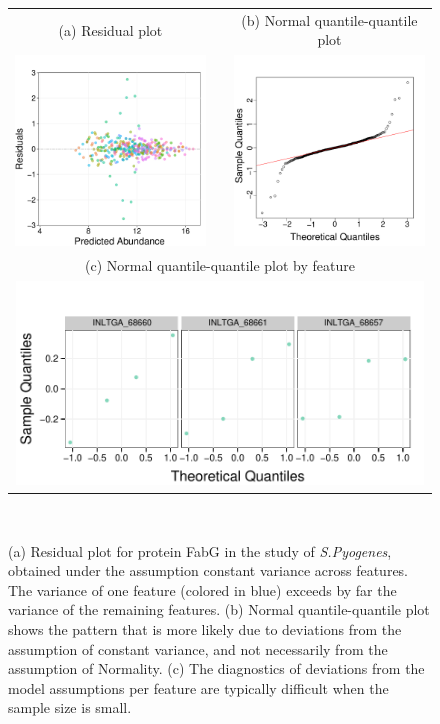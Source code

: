 \documentclass[11pt]{article}
\begin{document}
\begin{figure}[h!]
\begin{center}
\begin{tabular}{ccc}
{\footnotesize (a) Residual plot}& & {\footnotesize (b) Normal quantile-quantile plot } \\
\includegraphics[width=2.25in]{DIA_constant_ResidualPlot4.pdf}&&
\includegraphics[width=2.25in]{DIA_constant_QQPlot4.pdf}\\ [0.2in]
\multicolumn{3}{c}{\footnotesize (c) Normal quantile-quantile plot by feature} \\
\multicolumn{3}{c}{\includegraphics[width=4.25in]{SWATH_QQPlot_perFeature.pdf}}
\end{tabular}\\
\caption{\small (a) Residual plot for protein FabG in the study of {\it S.Pyogenes}, obtained under the assumption constant variance across features. The variance of one feature (colored in blue) exceeds by far the variance of the remaining features. (b) Normal quantile-quantile plot shows the pattern that is more likely due to deviations from the assumption of constant variance, and not necessarily from the assumption of Normality. (c) The diagnostics of deviations from the model assumptions per feature are typically difficult when the sample size is small. \label{fig:DIAresidualPlot}}
\end{center}
\end{figure}
\vspace{0.2cm}
\end{document}
